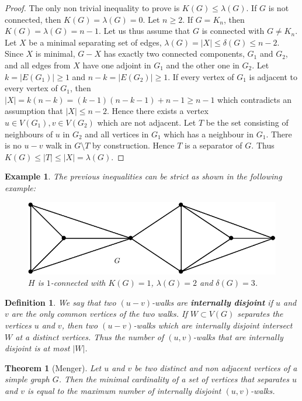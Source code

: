 \documentclass[12pt,a4paper]{article}
\newtheorem{thm}{Theorem}[section]
\newtheorem{defn}{Definition}[section]
\newtheorem{exmp}{Example}[section]
\theoremstyle{definition}
\begin{document}
\begin{proof}
The only non trivial inequality to prove is $K(G) \leq \lambda (G)$. If $G$ is not connected, then $K(G)= \lambda(G)=0$. Let $n \geq 2$. If $G=K_n$, then $K(G) = \lambda(G) = n-1$. Let us thus assume that $G$ is connected with $G \neq K_n$. Let $X$ be a minimal separating set of edges, $\lambda(G)= |X| \leq \delta (G) \leq n-2$. Since $X$ is minimal, $G-X$ has exactly two connected components, $G_1$ and $G_2$, and all edges from $X$ have one adjoint in $G_1$ and the other one in $G_2$. Let $k= |E(G_1)| \geq 1$ and $ n-k= |E(G_2)| \geq 1$. If every vertex of $G_1$ is adjacent to every vertex of $G_1$, then $|X|=k(n-k)=(k-1)(n-k-1)+n-1 \geq n-1$ which contradicts an  assumption that $|X| \leq n-2$. Hence there exists a vertex $u \in V(G_1), v   \in V(G_2)$ which are not adjacent. Let $T$ be the set consisting of neighbours of $u$ in $G_2$ and all vertices in $G_1$ which has a neighbour in $G_1$. There is no $u-v$ walk in $G \setminus T$ by construction. Hence $T$ is a separator of $G$. Thus $K(G) \leq |T| \leq |X| = \lambda(G)$. 
\end{proof}
\begin{exmp} The previous inequalities can be strict as shown in the following example:
\begin{figure}[hbtp]
\centering
\includegraphics[scale=1]{images/graph22.pdf}
\caption{$H$ is $1$-connected with $K(G)=1$, $\lambda(G)=2$ and $\delta(G)=3$.}
\end{figure}

\end{exmp}
\begin{defn} We say that two $(u-v)$-walks are \textbf{internally disjoint} if $u$ and $v$ are the only common vertices of the two walks. If $W \subset V(G)$ separates the vertices $u$ and $v$, then two $(u-v)$-walks which are internally disjoint intersect $W$ at a distinct vertices. Thus the number of $(u,v)$-walks that are internally disjoint is at most $|W|$. 
\end{defn}
\begin{thm}[Menger] Let $u$ and $v$ be two distinct and non adjacent vertices of a simple graph $G$. Then the minimal cardinality of a set of vertices that separates $u$ and $v$ is equal to the maximum number of internally disjoint $(u,v)$-walks.
\end{thm}
\end{document}
